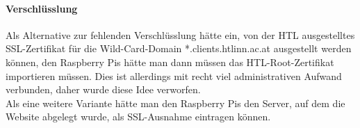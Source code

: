 \paragraph{Verschlüsslung}

Als Alternative zur fehlenden Verschlüsslung hätte ein, von der HTL ausgestelltes SSL-Zertifikat für die Wild-Card-Domain *.clients.htlinn.ac.at ausgestellt werden können, den Raspberry Pis hätte man dann müssen das HTL-Root-Zertifikat importieren müssen. Dies ist allerdings mit recht viel administrativen Aufwand verbunden, daher wurde diese Idee verworfen.\\
Als eine weitere Variante hätte man den Raspberry Pis den Server, auf dem die Website abgelegt wurde, als SSL-Ausnahme eintragen können. 